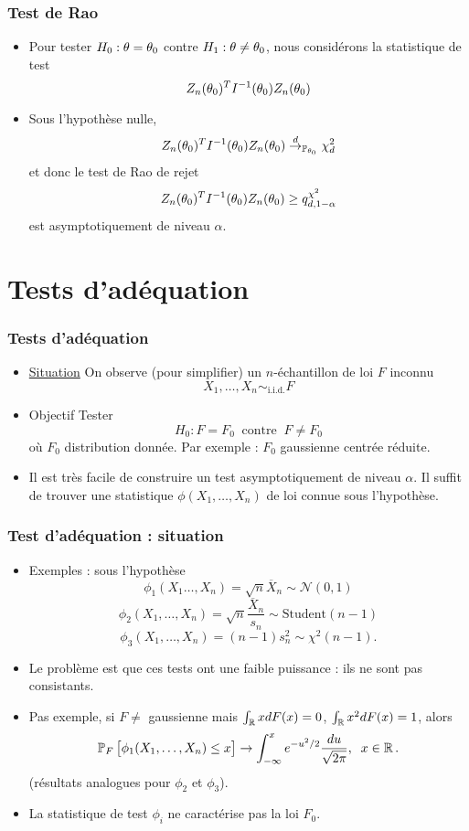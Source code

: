 \begin{frame}
\frametitle{Test de Rao}
\begin{itemize}
\item Pour tester $H_0: \theta= \theta_0$ contre $H_1: \theta \ne \theta_0$, nous considérons la statistique de test
\[
Z_n(\theta_0)^T I^{-1} (\theta_0) Z_n(\theta_0)
\]
\item Sous l'hypothèse nulle,
$$
Z_n(\theta_0)^T I^{-1} (\theta_0) Z_n(\theta_0) \stackrel{d}{\rightarrow}_{\operatorname{{\mathbb P}}_{\theta_0}} \chi^2_d
$$
et donc le test de Rao de rejet
$$
Z_n(\theta_0)^T I^{-1} (\theta_0) Z_n(\theta_0) \geq q_{d,1-\alpha}^{\chi^2}
$$
est asymptotiquement de niveau $\alpha$.
\end{itemize}
\end{frame}

\section{Tests d'adéquation}

\begin{frame}
\frametitle{Tests d'adéquation}
\begin{itemize}
\item \underline{Situation} On observe (pour simplifier) un $n$-échantillon de loi $F$ inconnu
$$X_1,\ldots, X_n\sim_{\text{i.i.d.}}F$$
\item \alert{Objectif} Tester
$$H_0:F=F_0\;\;\text{contre}\;\;F\neq F_0$$
où
$F_0$ distribution donnée. Par exemple : $F_0$ \alert{gaussienne centrée réduite}.
\item Il est \alert{très facile de construire un test asymptotiquement de niveau $\alpha$.}
Il suffit de trouver une statistique $\phi(X_1,\ldots, X_n)$ de loi connue sous l'hypothèse.
\end{itemize}
\end{frame}

\begin{frame}
\frametitle{Test d'adéquation : situation}
\begin{itemize}
\item \alert{Exemples : sous l'hypothèse}
$$\phi_1(X_1\ldots, X_n) = \sqrt{n}\overline{X}_n \sim {\mathcal N}(0,1)$$
$$\phi_2(X_1,\ldots, X_n) = \sqrt{n}\frac{\overline{X}_n}{s_n} \sim \text{Student}(n-1)$$
$$\phi_3(X_1,\ldots, X_n) = (n-1)s_n^2 \sim \chi^2(n-1).$$
\item Le problème est que ces tests \alert{ont une faible puissance} : ils ne sont pas consistants.
\item Pas exemple, si $F\neq$ gaussienne mais $\int_{\operatorname{{\mathbb R}}}xdF(x)=0$, $\int_{\operatorname{{\mathbb R}}}x^2dF(x)=1$, alors
$$\operatorname{{\mathbb P}}_{F}\big[\phi_1(X_1,\ldots,X_n) \leq x \big] \rightarrow \int_{-\infty}^x e^{-u^2/2}\frac{du}{\sqrt{2\pi}},\;\;x \in \operatorname{{\mathbb R}}.$$
(résultats analogues pour $\phi_2$ et $\phi_3$).
\item La statistique de test $\phi_i$ \alert{ne caractérise pas} la loi $F_0$.
\end{itemize}
\end{frame}


